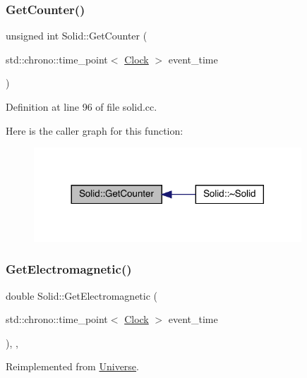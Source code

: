 \subsubsection{\texorpdfstring{Get\+Counter()}{GetCounter()}}
{\footnotesize\ttfamily unsigned int Solid\+::\+Get\+Counter (\begin{DoxyParamCaption}\item[{std\+::chrono\+::time\+\_\+point$<$ \hyperlink{universe_8h_a0ef8d951d1ca5ab3cfaf7ab4c7a6fd80}{Clock} $>$}]{event\+\_\+time }\end{DoxyParamCaption})}



Definition at line 96 of file solid.\+cc.

Here is the caller graph for this function\+:
\nopagebreak
\begin{figure}[H]
\begin{center}
\leavevmode
\includegraphics[width=284pt]{class_solid_a7ca41431033d05957f8be3f49c3aca23_icgraph}
\end{center}
\end{figure}
\mbox{\label{class_solid_a01cd3c441a4e339927c43536de6d9b5e}} 
\subsubsection{\texorpdfstring{Get\+Electromagnetic()}{GetElectromagnetic()}}
{\footnotesize\ttfamily double Solid\+::\+Get\+Electromagnetic (\begin{DoxyParamCaption}\item[{std\+::chrono\+::time\+\_\+point$<$ \hyperlink{universe_8h_a0ef8d951d1ca5ab3cfaf7ab4c7a6fd80}{Clock} $>$}]{event\+\_\+time }\end{DoxyParamCaption})\hspace{0.3cm}{\ttfamily [inline]}, {\ttfamily [final]}, {\ttfamily [virtual]}}



Reimplemented from \hyperlink{class_universe_a63b850ef3f3394313353109d222bf5d1}{Universe}.



